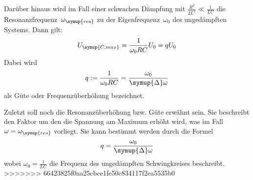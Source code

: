 Darüber hinaus wird im Fall einer schwachen Dämpfung mit $\frac{R^2}{2L^2} \ll \frac{1}{LC}$ die Resonanzfrequenz~$\omega_{\symup{res}}$ zu der 
Eigenfrequenz~$\omega_0$ des ungedämpften Systems. Dann gilt:
\begin{equation}
    U_{\symup{C,max}} = \frac{1}{\omega_0 RC}U_0 = qU_0 \notag
\end{equation}
Dabei wird
\begin{equation}
    q:=\frac{1}{\omega_0 RC} = \frac{\omega_0}{\symup{\Delta}\omega}
    \label{eq:Güte}
\end{equation}
als Güte oder Frequenzüberhöhung bezeichnet.

Zuletzt soll noch die Resonanzüberhöhung bzw. Güte erwähnt sein. Sie beschreibt den Faktor um den die Spannung am Maximum erhöht wird,
was im Fall $\omega=\omega_{\symup{res}}$ vorliegt.
Sie kann bestimmt werden durch die Formel
\begin{equation}
    q=\frac{\omega_0}{\symup{\Delta}\omega}
    \label{eq:Güte}
\end{equation}
wobei $\omega_{0}=\frac{1}{LC}$ die Frequenz des ungedämpften Schwingkreises beschreibt.
>>>>>>> 66423825f0aa25cbce1fe50c834117f2ea5535b0
